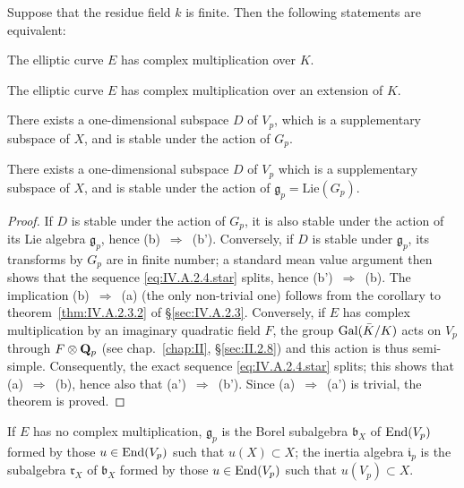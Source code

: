 \begin{theorem}
Suppose that the residue field $k$ is finite. Then the following
statements are equivalent:
\begin{alist}
\item[(a)] The elliptic curve $E$ has complex multiplication over $K$.
\item[(a')] The elliptic curve $E$ has complex multiplication over an
extension of $K$.
\item[(b)] There exists a one-dimensional subspace $D$ of $V_p$, which
is a supplementary subspace of $X$, and is stable under the action of
$G_p$.
\item[(b')] There exists a one-dimensional subspace $D$ of $V_p$ which
is a supplementary subspace of $X$, and is stable under the action of
$\mathfrak{g}_p=\mathrm{Lie}(G_p)$.
\end{alist}
\end{theorem}

\begin{proof}
If $D$ is stable under the action of $G_p$, it is also stable under the
action of its Lie algebra $\mathfrak{g}_p$, hence
(b)~$\Rightarrow$~(b'). Conversely, if $D$ is stable under
$\mathfrak{g}_p$, its transforms by $G_p$ are in finite number; a
standard mean value argument then shows that the sequence
\eqref{eq:IV.A.2.4.star} splits, hence (b')~$\Rightarrow$~(b). The
implication (b)~$\Rightarrow$~(a) (the only non-trivial one) follows
from the corollary to theorem~\ref{thm:IV.A.2.3.2} of
\S\ref{sec:IV.A.2.3}. Conversely, if $E$ has complex multiplication by
an imaginary quadratic field $F$, the group $\mathrm{Gal}(\bar K/K)$ acts on
$V_p$ through $F\mathbin{\otimes}\mathbf{Q}_p$ (see chap.~\ref{chap:II},
\S\ref{sec:II.2.8}) and this action is thus semi-simple. Consequently,
the exact sequence \eqref{eq:IV.A.2.4.star} splits; this shows that
(a)~$\Rightarrow$~(b), hence also that (a')~$\Rightarrow$~(b'). Since
(a)~$\Rightarrow$~(a') is trivial, the theorem is proved.
\end{proof}

\begin{corollary}[1]\label{cor:IV.A.2.4.1}
If $E$ has no complex multiplication, $\mathfrak{g}_p$ is the Borel
subalgebra $\mathfrak{b}_X$ of $\mathrm{End}(V_p)$ formed by those
$u\in\mathrm{End}(V_p)$ such that $u(X)\subset X$; the inertia algebra
$\mathfrak{i}_p$ is the subalgebra $\mathfrak{r}_X$ of
$\mathfrak{b}_X$ formed by those $u\in\mathrm{End}(V_p)$ such that
$u(V_p)\subset X$.
\end{corollary}

